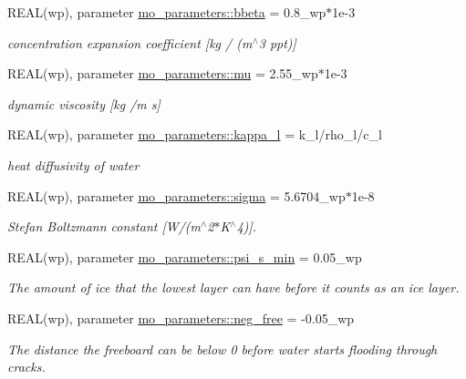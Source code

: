 \begin{DoxyCompactItemize}
REAL(wp), parameter \hyperlink{namespacemo__parameters_acde561d09dcbc152555d452514b4a71b}{mo\_\-parameters::bbeta} = 0.8\_\-wp$\ast$1e-\/3
\begin{DoxyCompactList}\small\item\em concentration expansion coefficient \mbox{[}kg / (m$^\wedge$3 ppt)\mbox{]} \item\end{DoxyCompactList}\item 
REAL(wp), parameter \hyperlink{namespacemo__parameters_a64a337227f714967ae941ebe24b935ce}{mo\_\-parameters::mu} = 2.55\_\-wp$\ast$1e-\/3
\begin{DoxyCompactList}\small\item\em dynamic viscosity \mbox{[}kg /m s\mbox{]} \item\end{DoxyCompactList}\item 
REAL(wp), parameter \hyperlink{namespacemo__parameters_a5355c60cba43613d845739fba4c9e0af}{mo\_\-parameters::kappa\_\-l} = k\_\-l/rho\_\-l/c\_\-l
\begin{DoxyCompactList}\small\item\em heat diffusivity of water \item\end{DoxyCompactList}\item 
REAL(wp), parameter \hyperlink{namespacemo__parameters_a84bbd94990a472b5855a98d709d0a8af}{mo\_\-parameters::sigma} = 5.6704\_\-wp$\ast$1e-\/8
\begin{DoxyCompactList}\small\item\em Stefan Boltzmann constant \mbox{[}W/(m$^\wedge$2$\ast$K$^\wedge$4)\mbox{]}. \item\end{DoxyCompactList}\item 
REAL(wp), parameter \hyperlink{namespacemo__parameters_a220395b5fd47214fbb07e7e55c635e4f}{mo\_\-parameters::psi\_\-s\_\-min} = 0.05\_\-wp
\begin{DoxyCompactList}\small\item\em The amount of ice that the lowest layer can have before it counts as an ice layer. \item\end{DoxyCompactList}\item 
REAL(wp), parameter \hyperlink{namespacemo__parameters_ad1d58450590f138e7d1116327f563f30}{mo\_\-parameters::neg\_\-free} = -\/0.05\_\-wp
\begin{DoxyCompactList}\small\item\em The distance the freeboard can be below 0 before water starts flooding through cracks. \item\end{DoxyCompactList}\item 

\end{DoxyCompactItemize}

